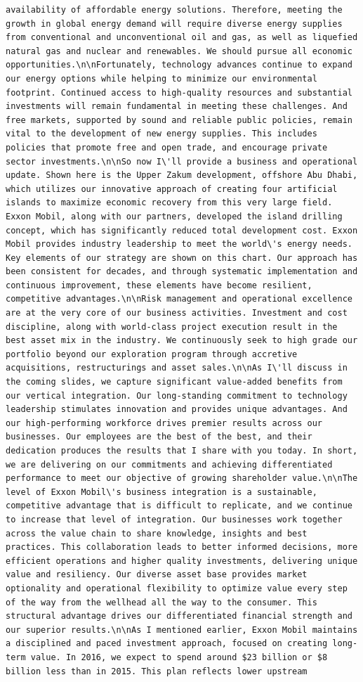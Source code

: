 \documentclass[
  letterpaper,
  DIV=11,
  numbers=noendperiod]{scrreprt}
\begin{document}
\begin{verbatim}
availability of affordable energy solutions. Therefore, meeting the growth in global energy demand will require diverse energy supplies from conventional and unconventional oil and gas, as well as liquefied natural gas and nuclear and renewables. We should pursue all economic opportunities.\n\nFortunately, technology advances continue to expand our energy options while helping to minimize our environmental footprint. Continued access to high-quality resources and substantial investments will remain fundamental in meeting these challenges. And free markets, supported by sound and reliable public policies, remain vital to the development of new energy supplies. This includes policies that promote free and open trade, and encourage private sector investments.\n\nSo now I\'ll provide a business and operational update. Shown here is the Upper Zakum development, offshore Abu Dhabi, which utilizes our innovative approach of creating four artificial islands to maximize economic recovery from this very large field. Exxon Mobil, along with our partners, developed the island drilling concept, which has significantly reduced total development cost. Exxon Mobil provides industry leadership to meet the world\'s energy needs. Key elements of our strategy are shown on this chart. Our approach has been consistent for decades, and through systematic implementation and continuous improvement, these elements have become resilient, competitive advantages.\n\nRisk management and operational excellence are at the very core of our business activities. Investment and cost discipline, along with world-class project execution result in the best asset mix in the industry. We continuously seek to high grade our portfolio beyond our exploration program through accretive acquisitions, restructurings and asset sales.\n\nAs I\'ll discuss in the coming slides, we capture significant value-added benefits from our vertical integration. Our long-standing commitment to technology leadership stimulates innovation and provides unique advantages. And our high-performing workforce drives premier results across our businesses. Our employees are the best of the best, and their dedication produces the results that I share with you today. In short, we are delivering on our commitments and achieving differentiated performance to meet our objective of growing shareholder value.\n\nThe level of Exxon Mobil\'s business integration is a sustainable, competitive advantage that is difficult to replicate, and we continue to increase that level of integration. Our businesses work together across the value chain to share knowledge, insights and best practices. This collaboration leads to better informed decisions, more efficient operations and higher quality investments, delivering unique value and resiliency. Our diverse asset base provides market optionality and operational flexibility to optimize value every step of the way from the wellhead all the way to the consumer. This structural advantage drives our differentiated financial strength and our superior results.\n\nAs I mentioned earlier, Exxon Mobil maintains a disciplined and paced investment approach, focused on creating long-term value. In 2016, we expect to spend around $23 billion or $8 billion less than in 2015. This plan reflects lower upstream 
\end{verbatim}
\end{document}
